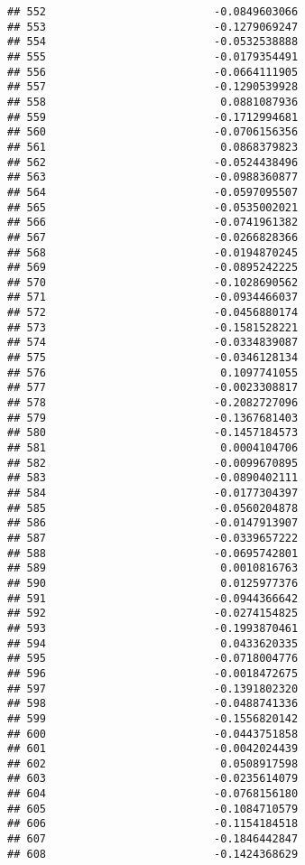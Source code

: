 \documentclass[
]{article}
\begin{document}
\begin{verbatim}
## 552                          -0.0849603066
## 553                          -0.1279069247
## 554                          -0.0532538888
## 555                          -0.0179354491
## 556                          -0.0664111905
## 557                          -0.1290539928
## 558                           0.0881087936
## 559                          -0.1712994681
## 560                          -0.0706156356
## 561                           0.0868379823
## 562                          -0.0524438496
## 563                          -0.0988360877
## 564                          -0.0597095507
## 565                          -0.0535002021
## 566                          -0.0741961382
## 567                          -0.0266828366
## 568                          -0.0194870245
## 569                          -0.0895242225
## 570                          -0.1028690562
## 571                          -0.0934466037
## 572                          -0.0456880174
## 573                          -0.1581528221
## 574                          -0.0334839087
## 575                          -0.0346128134
## 576                           0.1097741055
## 577                          -0.0023308817
## 578                          -0.2082727096
## 579                          -0.1367681403
## 580                          -0.1457184573
## 581                           0.0004104706
## 582                          -0.0099670895
## 583                          -0.0890402111
## 584                          -0.0177304397
## 585                          -0.0560204878
## 586                          -0.0147913907
## 587                          -0.0339657222
## 588                          -0.0695742801
## 589                           0.0010816763
## 590                           0.0125977376
## 591                          -0.0944366642
## 592                          -0.0274154825
## 593                          -0.1993870461
## 594                           0.0433620335
## 595                          -0.0718004776
## 596                          -0.0018472675
## 597                          -0.1391802320
## 598                          -0.0488741336
## 599                          -0.1556820142
## 600                          -0.0443751858
## 601                          -0.0042024439
## 602                           0.0508917598
## 603                          -0.0235614079
## 604                          -0.0768156180
## 605                          -0.1084710579
## 606                          -0.1154184518
## 607                          -0.1846442847
## 608                          -0.1424368629

\end{verbatim}
\end{document}
